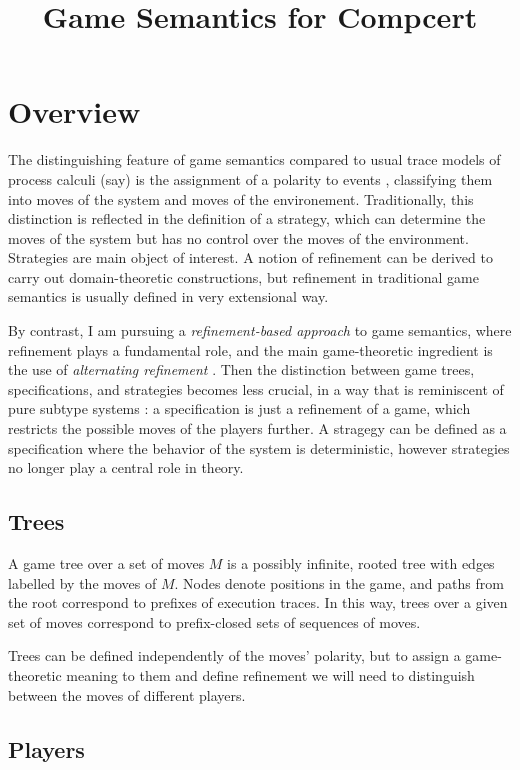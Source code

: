 \documentclass[11pt]{article}
\title{Game Semantics for Compcert}
\begin{document}
\maketitle

\section{Overview}

The distinguishing feature of game semantics
compared to usual trace models of process calculi (say)
is the assignment of a polarity to events \cite{cspgs},
classifying them into moves of the system
and moves of the environement.
Traditionally,
this distinction is reflected in the definition of a strategy,
which can determine the moves of the system
but has no control over the moves of the environment.
Strategies are main object of interest.
A notion of refinement can be derived
to carry out domain-theoretic constructions,
but refinement in traditional game semantics
is usually defined in very extensional way.

By contrast,
I am pursuing a \emph{refinement-based approach} to game semantics,
where refinement plays a fundamental role,
and the main game-theoretic ingredient is the use of
\emph{alternating refinement} \cite{altref}.
Then
the distinction between game trees, specifications, and strategies
becomes less crucial,
in a way that is reminiscent of pure subtype systems \cite{pts}:
a specification is just a refinement of a game,
which restricts the possible moves of the players further.
A stragegy can be defined as
a specification where the behavior of the system is deterministic,
however strategies no longer play a central role in theory.

\subsection{Trees}

A game tree over a set of moves $M$
is a possibly infinite, rooted tree
with edges labelled by the moves of $M$.
Nodes denote positions in the game, and
paths from the root correspond to
prefixes of execution traces.
In this way, trees over a given set of moves
correspond to prefix-closed sets of sequences of moves.

Trees can be defined
independently of the moves' polarity,
but to assign a game-theoretic meaning to them
and define refinement
we will need to distinguish between
the moves of different players.

\subsection{Players}
\end{document}
